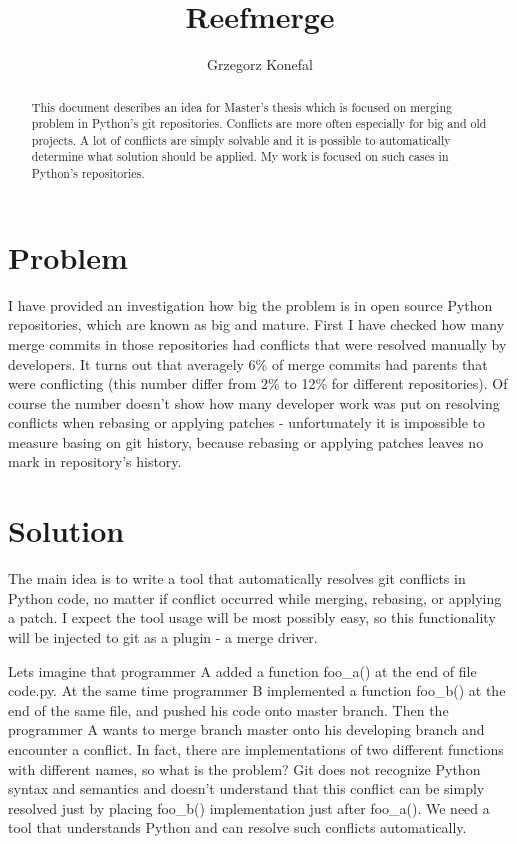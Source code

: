 \documentclass[a4paper,10pt]{article}
\title{Reefmerge}
\author{Grzegorz Konefal}
\begin{document}
\maketitle

\begin{abstract}

This document describes an idea for Master's thesis which is focused on merging problem in Python's git repositories.
Conflicts are more often especially for big and old projects.
A lot of conflicts are simply solvable and it is possible to automatically determine what solution should be applied.
My work is focused on such cases in Python's repositories.

\end{abstract}

\section*{Problem}

I have provided an investigation how big the problem is in open source Python repositories,
which are known as big and mature.
First I have checked how many merge commits in those repositories had conflicts that were resolved manually by developers.
It turns out that averagely 6\% of merge commits had parents that were conflicting
(this number differ from 2\% to 12\% for different repositories).
Of course the number doesn't show how many developer work was put on resolving conflicts
when rebasing or applying patches - unfortunately it is impossible to measure basing on git history,
because rebasing or applying patches leaves no mark in repository's history.

\section*{Solution}

The main idea is to write a tool that automatically resolves git conflicts in Python code,
no matter if conflict occurred while merging, rebasing, or applying a patch.
I expect the tool usage will be most possibly easy,
so this functionality will be injected to git as a plugin - a merge driver.

Lets imagine that programmer A added a function foo\_a() at the end of file code.py.
At the same time programmer B implemented a function foo\_b() at the end of the same file,
and pushed his code onto master branch. Then the programmer A wants to merge branch master onto his
developing branch and encounter a conflict. In fact, there are implementations of two different
functions with different names, so what is the problem?
Git does not recognize Python syntax and semantics and doesn't understand that this conflict
can be simply resolved just by placing foo\_b() implementation just after foo\_a().
We need a tool that understands Python and can resolve such conflicts automatically.
\end{document}
